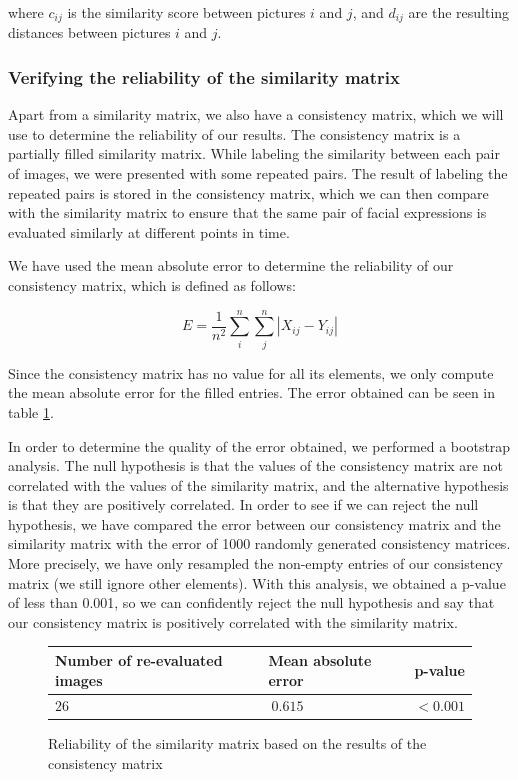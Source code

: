 \documentclass[11pt, a4paper]{article}
\numberwithin{equation}{subsection}
\begin{document}
where $c_{ij}$ is the similarity score between pictures $i$ and $j$, and $d_{ij}$ are the resulting distances between pictures $i$ and $j$.


\subsubsection{Verifying the reliability of the similarity matrix}

Apart from a similarity matrix, we also have a consistency matrix, which we will use to determine the reliability of our results. The consistency matrix is a partially filled similarity matrix. While labeling the similarity between each pair of images, we were presented with some repeated pairs. The result of labeling the repeated pairs is stored in the consistency matrix, which we can then compare with the similarity matrix to ensure that the same pair of facial expressions is evaluated similarly at different points in time.

We have used the mean absolute error to determine the reliability of our consistency matrix, which is defined as follows:

\begin{equation}\label{eq:mean_abs_error}
    E = \frac{1}{n^2} \sum_i^n\sum_j^n |{X_{ij} - Y_{ij}}|
\end{equation}

Since the consistency matrix has no value for all its elements, we only compute the mean absolute error for the filled entries. The error obtained can be seen in table \ref{tab:similarity_reliability}.

In order to determine the quality of the error obtained, we performed a bootstrap analysis. The null hypothesis is that the values of the consistency matrix are not correlated with the values of the similarity matrix, and the alternative hypothesis is that they are positively correlated. In order to see if we can reject the null hypothesis, we have compared the error between our consistency matrix and the similarity matrix with the error of 1000 randomly generated consistency matrices. More precisely, we have only resampled the non-empty entries of our consistency matrix (we still ignore other elements). With this analysis, we obtained a p-value of less than 0.001, so we can confidently reject the null hypothesis and say that our consistency matrix is positively correlated with the similarity matrix.

\begin{figure}[h]
    \centering
    \begin{tabular}{l|l|l}
            \textbf{Number of re-evaluated images} & \textbf{Mean absolute error} & \textbf{p-value} \\ \hline
            $26$                                     & $~0.615$                       & $< 0.001$          \\
    \end{tabular}
    \captionsetup{type=table}
    \caption{Reliability of the similarity matrix based on the results of the consistency matrix}
    \label{tab:similarity_reliability}
\end{figure}
\end{document}
